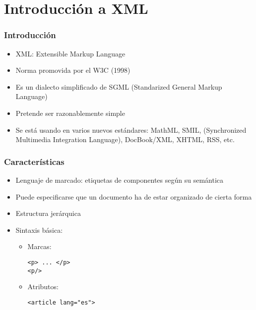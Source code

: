 %


\section{Introducción a XML}


\begin{frame}
\frametitle{Introducción}


\begin{itemize}
\item XML: Extensible Markup Language
\item Norma promovida por el W3C (1998)
\item Es un dialecto simplificado de SGML (Standarized General Markup
  Language)
\item Pretende ser razonablemente simple
\item Se está usando en varios nuevos estándares: MathML, SMIL,
  (Synchronized Multimedia Integration Language), DocBook/XML, 
  XHTML, RSS, etc.
\end{itemize}

\end{frame}


\begin{frame}[fragile]
\frametitle{Características}

\begin{itemize}
\item Lenguaje de marcado: etiquetas de componentes según su semántica
\item Puede especificarse que un documento ha de estar organizado de
  cierta forma
\item Estructura jerárquica
\item Sintaxis básica:
  \begin{itemize}
  \item Marcas: 
\begin{verbatim}
<p> ... </p> 
<p/>
\end{verbatim}
  \item Atributos: 
\begin{verbatim}
<article lang="es">
\end{verbatim}
  \end{itemize}
\end{itemize}

\end{frame}

